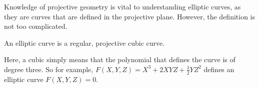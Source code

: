 Knowledge of projective geometry is vital to understanding elliptic curves, as they are curves that are defined in the projective plane.
However, the definition is not too complicated.
\begin{definition}
	An elliptic curve is a regular, projective cubic curve.
\end{definition}
Here, a cubic simply means that the polynomial that defines the curve is of degree three.
So for example, $F(X,Y,Z) = X^3 + 2XYZ + \frac{1}{2}YZ^2$ defines an elliptic curve $F(X,Y,Z) = 0$.
